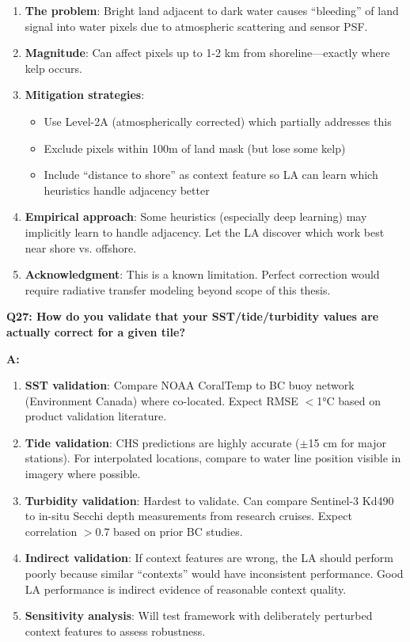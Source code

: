 \documentclass[11pt]{article}
\begin{document}
\begin{enumerate}
    \item \textbf{The problem}: Bright land adjacent to dark water causes ``bleeding'' of land signal into water pixels due to atmospheric scattering and sensor PSF.

    \item \textbf{Magnitude}: Can affect pixels up to 1-2 km from shoreline---exactly where kelp occurs.

    \item \textbf{Mitigation strategies}:
    \begin{itemize}
        \item Use Level-2A (atmospherically corrected) which partially addresses this
        \item Exclude pixels within 100m of land mask (but lose some kelp)
        \item Include ``distance to shore'' as context feature so LA can learn which heuristics handle adjacency better
    \end{itemize}

    \item \textbf{Empirical approach}: Some heuristics (especially deep learning) may implicitly learn to handle adjacency. Let the LA discover which work best near shore vs. offshore.

    \item \textbf{Acknowledgment}: This is a known limitation. Perfect correction would require radiative transfer modeling beyond scope of this thesis.
\end{enumerate}

\textbf{Q27: How do you validate that your SST/tide/turbidity values are actually correct for a given tile?}

\textbf{A:}

\begin{enumerate}
    \item \textbf{SST validation}: Compare NOAA CoralTemp to BC buoy network (Environment Canada) where co-located. Expect RMSE $<$1°C based on product validation literature.

    \item \textbf{Tide validation}: CHS predictions are highly accurate ($\pm$15 cm for major stations). For interpolated locations, compare to water line position visible in imagery where possible.

    \item \textbf{Turbidity validation}: Hardest to validate. Can compare Sentinel-3 Kd490 to in-situ Secchi depth measurements from research cruises. Expect correlation $>$0.7 based on prior BC studies.

    \item \textbf{Indirect validation}: If context features are wrong, the LA should perform poorly because similar ``contexts'' would have inconsistent performance. Good LA performance is indirect evidence of reasonable context quality.

    \item \textbf{Sensitivity analysis}: Will test framework with deliberately perturbed context features to assess robustness.
\end{enumerate}
\end{document}
